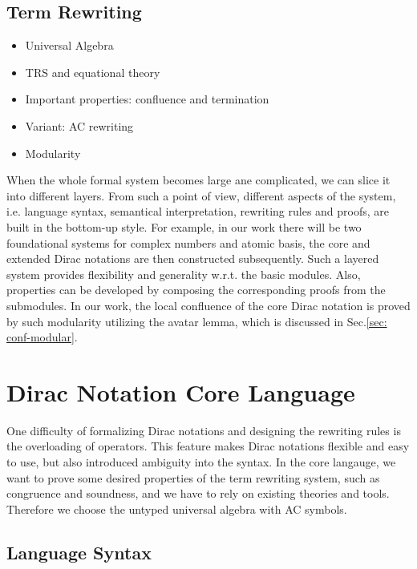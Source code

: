 \documentclass[manuscript, review, timestamp]{acmart}
\begin{document}
\subsection{Term Rewriting}

\begin{itemize}
  \item Universal Algebra

  \item TRS and equational theory
  
  \item Important properties: confluence and termination
  
  \item Variant: AC rewriting
  
  \item Modularity
\end{itemize}

When the whole formal system becomes large ane complicated, we can slice it into different layers. From such a point of view, different aspects of the system, i.e. language syntax, semantical interpretation, rewriting rules and proofs, are built in the bottom-up style. For example, in our work there will be two foundational systems for complex numbers and atomic basis, the core and extended Dirac notations are then constructed subsequently. Such a layered system provides flexibility and generality w.r.t. the basic modules. Also, properties can be developed by composing the corresponding proofs from the submodules. In our work, the local confluence of the core Dirac notation is proved by such modularity utilizing the avatar lemma, which is discussed in Sec.\ref{sec: conf-modular}.


\section{Dirac Notation Core Language}

One difficulty of formalizing Dirac notations and designing the rewriting rules is the overloading of operators. This feature makes Dirac notations flexible and easy to use, but also introduced ambiguity into the syntax. In the core langauge, we want to prove some desired properties of the term rewriting system, such as congruence and soundness, and we have to rely on existing theories and tools. Therefore we choose the untyped universal algebra with AC symbols.






\subsection{Language Syntax}
\end{document}

